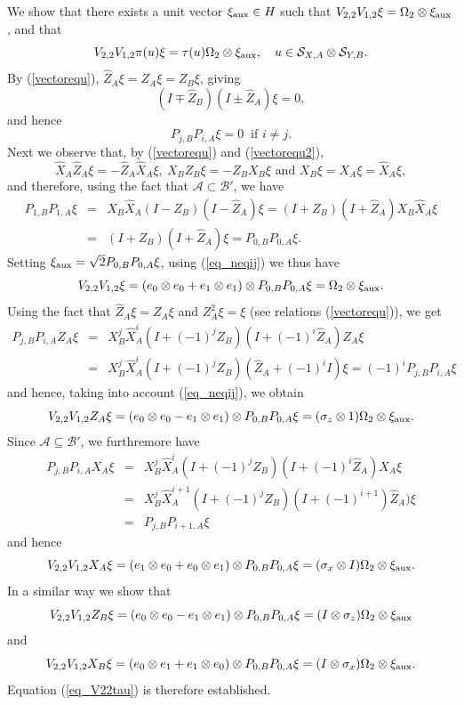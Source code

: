 \documentclass[11pt]{amsart}
\theoremstyle{definition}
\newcommand{\cl}[1]{\mathcal{#1}}
\begin{document}
We show that 
there exists a unit vector $\xi_{\rm aux}\in H$ such that
$V_{2,2}V_{1,2}\xi=\Omega_2\otimes\xi_{\rm aux}$, and that 
\begin{equation}\label{eq_V22tau}
V_{2,2}V_{1,2}\pi(u)\xi = \tau(u)\Omega_2\otimes\xi_{\rm aux}, 
\ \ \ u\in \cl S_{X,A}\otimes\cl S_{Y,B}.
\end{equation}
By (\ref{vectorequ}), $\hat Z_A\xi=Z_A\xi=Z_B\xi$, giving  
$$(I \mp \hat Z_B)(I \pm \hat Z_A)\xi = 0,$$
and hence 
\begin{equation}\label{eq_neqij}
P_{j,B}P_{i,A}\xi=0 \ \mbox{ if } i\ne j. 
\end{equation}
Next we observe that, by (\ref{vectorequ}) and (\ref{vectorequ2}), 
$$\hat X_A\hat Z_A\xi=-\hat Z_A\hat X_A\xi, 
\ X_BZ_B\xi=-Z_BX_B\xi \mbox{ and }  X_B\xi=X_A\xi=\hat X_A\xi,$$ and therefore, using the fact that $\cl A\subset \cl B'$, we have 
\begin{eqnarray*}
P_{1,B}P_{1,A}\xi
& = &
X_B\hat X_A(I-Z_B)(I - \hat Z_A)\xi
= (I + Z_B)(I + \hat Z_A)X_B\hat X_A\xi\\
& = &
(I + Z_B)(I + \hat Z_A)\xi
= P_{0,B}P_{0,A}\xi.
\end{eqnarray*}
Setting $\xi_{\rm aux}=\sqrt{2}P_{0,B}P_{0,A}\xi$, using (\ref{eq_neqij}) we thus have
$$V_{2,2}V_{1,2}\xi=(e_0\otimes e_0+e_1\otimes e_1)\otimes P_{0,B}P_{0,A}\xi = \Omega_2\otimes \xi_{\rm aux}.$$
Using the fact that $\hat Z_A\xi=Z_A\xi$ and $Z_A^2\xi=\xi$
(see relations (\ref{vectorequ})), we get
\begin{eqnarray*}
P_{j,B}P_{i,A}Z_A\xi
& = &
X_B^j\hat X_A^i(I + (-1)^jZ_B)(I + (-1)^i\hat Z_A)Z_A\xi\\
& = &
X_B^j\hat X_A^i(I + (-1)^jZ_B)(\hat Z_A+(-1)^iI)\xi
= (-1)^iP_{j,B}P_{i,A}\xi
\end{eqnarray*}
and hence, taking into account (\ref{eq_neqij}), we obtain 
$$V_{2,2}V_{1,2}Z_A\xi=(e_0\otimes e_0-e_1\otimes e_1)\otimes P_{0,B}P_{0,A}\xi
= (\sigma_z\otimes 1)\Omega_2\otimes\xi_{\rm aux}.$$
Since $\cl A\subseteq \cl B'$, we furthremore have
\begin{eqnarray*}
P_{j,B}P_{i,A}X_A\xi
& = &
X_B^j\hat X_A^i(I+(-1)^jZ_B)(I+(-1)^i\hat Z_A)X_A\xi\\
& = &
X_B^j\hat X_A^{i+1}(I+(-1)^jZ_B)(I+(-1)^{i+1})\hat Z_A)\xi\\
& = & 
P_{j,B}P_{i+1,A}\xi   
\end{eqnarray*}
and hence 
$$V_{2,2}V_{1,2}X_A\xi=(e_1\otimes e_0+e_0\otimes e_1)\otimes P_{0,B}P_{0,A}\xi=(\sigma_x\otimes I)\Omega_2\otimes\xi_{\rm aux}.$$
In a similar way we show that
$$V_{2,2}V_{1,2}Z_B\xi = (e_0\otimes e_0-e_1\otimes e_1)\otimes P_{0,B}P_{0,A}\xi=(I\otimes\sigma_z)\Omega_2\otimes\xi_{\rm aux}$$
and 
$$V_{2,2}V_{1,2}X_B\xi = (e_0\otimes e_1+e_1\otimes e_0)\otimes P_{0,B}P_{0,A}\xi=(I\otimes\sigma_x)\Omega_2\otimes\xi_{\rm aux}.$$
Equation (\ref{eq_V22tau}) is therefore established.
\end{document}

